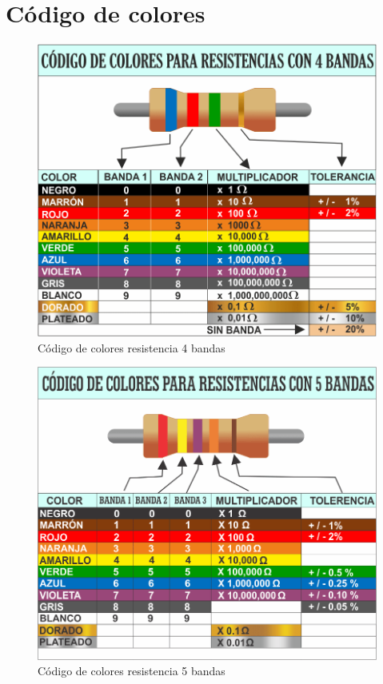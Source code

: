 \documentclass[a4paper,12pt]{report}
\begin{document}
\chapter{Código de colores}
\begin{figure}[H]
\begin{center}
\includegraphics[scale=0.45]{resis5.png}
\caption{Código de colores resistencia 4 bandas}
\end{center}
\end{figure}
\begin{figure}[H]
\begin{center}
\includegraphics[scale=0.45]{resis4.png}
\caption{Código de colores resistencia 5 bandas}
\end{center}
\end{figure}
\end{document}
